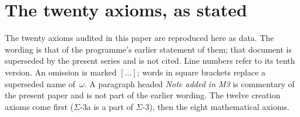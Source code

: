 
\section{The twenty axioms, as stated}\label{app:axioms}

\noindent The twenty axioms audited in this paper are reproduced here as data.
The wording is that of the programme's earlier statement of them; that
document is superseded by the present series and is not cited. Line numbers
refer to its tenth version. An omission is marked $[\ldots]$; words in square
brackets replace a superseded name of~$\omega$. A paragraph headed \emph{Note
added in M3} is commentary of the present paper and is not part of the earlier
wording. The twelve creation axioms
come first ($\Sigma$-3a is a part of $\Sigma$-3), then the eight mathematical
axioms.

